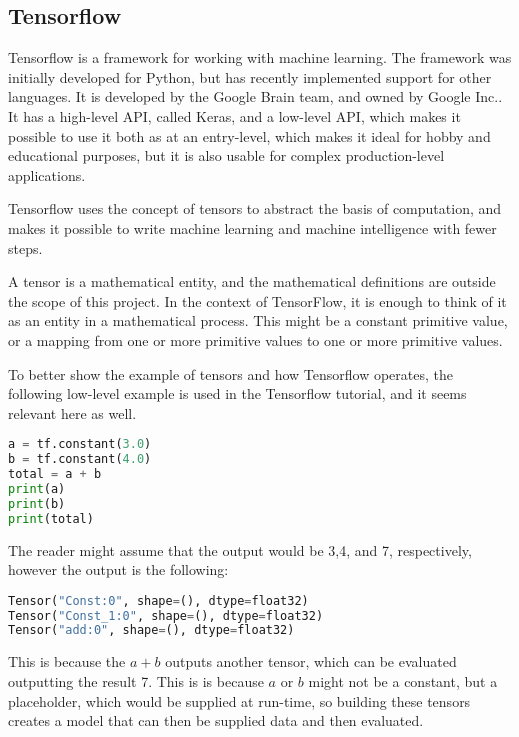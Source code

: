 \subsection{Tensorflow}
Tensorflow is a framework for working with machine learning\cite{tensorflow2015-whitepaper}.
The framework was initially developed for Python, but has recently implemented support for other languages.
It is developed by the Google Brain team, and owned by Google Inc.\cite{tensorflow-attribution}.
It has a high-level API, called Keras, and a low-level API, which makes it possible to use it both as at an entry-level, which makes it ideal for hobby and educational purposes, but it is also usable for complex production-level applications.

Tensorflow uses the concept of tensors to abstract the basis of computation, and makes it possible to write machine learning and machine intelligence with fewer steps.

A tensor is a mathematical entity, and the mathematical definitions are outside the scope of this project.
In the context of TensorFlow, it is enough to think of it as an entity in a mathematical process.
This might be a constant primitive value, or a mapping from one or more primitive values to one or more primitive values.

To better show the example of tensors and how Tensorflow operates, the following low-level example is used in the Tensorflow tutorial, and it seems relevant here as well.

\begin{lstlisting}[language=Python,label=lis:TensorFlowPy1,caption=Example of a Tensorflow program]
a = tf.constant(3.0)
b = tf.constant(4.0)
total = a + b
print(a)
print(b)
print(total)
\end{lstlisting}
The reader might assume that the output would be 3,4, and 7, respectively, however the output is the following:
\begin{lstlisting}[language=Python,label=lis:TensorFlowPy2,caption=Output of example \autoref{lis:TensorFlowPy2}]
Tensor("Const:0", shape=(), dtype=float32)
Tensor("Const_1:0", shape=(), dtype=float32)
Tensor("add:0", shape=(), dtype=float32)
\end{lstlisting}
This is because the $ a + b $ outputs another tensor, which can be evaluated outputting the result 7.
This is is because $a$ or $b$ might not be a constant, but a placeholder, which would be supplied at run-time, so building these tensors creates a model that can then be supplied data and then evaluated.

